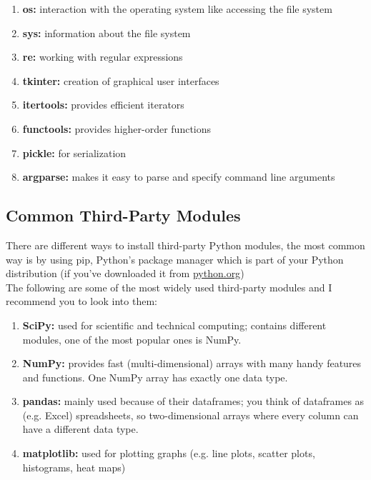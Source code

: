         \begin{enumerate}
            \item \textbf{os:} interaction with the operating system like accessing the file system
            \item \textbf{sys:} information about the file system
            \item \textbf{re:} working with regular expressions
            \item \textbf{tkinter:} creation of graphical user interfaces
            \item \textbf{itertools:} provides efficient iterators
            \item \textbf{functools:} provides higher-order functions
            \item \textbf{pickle:} for serialization
            \item \textbf{argparse:} makes it easy to parse and specify command line arguments
        \end{enumerate}
    
    \subsection{Common Third-Party Modules}
        There are different ways to install third-party Python modules, the most common way is by using pip, Python's package manager which is part of your Python distribution (if you've downloaded it from \href{https://python.org}{python.org})\\
        The following are some of the most widely used third-party modules and I recommend you to look into them:
        \begin{enumerate}
            \item \textbf{SciPy:} used for scientific and technical computing; contains different modules, one of the most popular ones is NumPy. 
            \item \textbf{NumPy:} provides fast (multi-dimensional) arrays with many handy features and functions. One NumPy array has exactly one data type.
            \item \textbf{pandas:} mainly used because of their dataframes; you think of dataframes as (e.g. Excel) spreadsheets, so two-dimensional arrays where every column can have a different data type.
            \item \textbf{matplotlib:} used for plotting graphs (e.g. line plots, scatter plots, histograms, heat maps)
        \end{enumerate}
    
